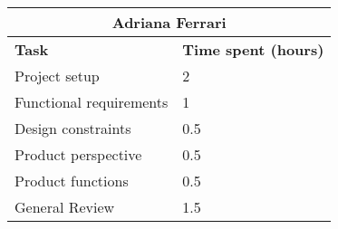 \begin{table}[h]
  \center
  \begin{tabular}{l|l}
    \multicolumn{2}{c}{\textbf{Adriana Ferrari}} \\
    \hline
    \textbf{Task} & \textbf{Time spent (hours)}\\
    \hline
    Project setup & 2 \\
    Functional requirements & 1 \\
    Design constraints & 0.5 \\
    Product perspective & 0.5 \\
    Product functions & 0.5 \\
    General Review & 1.5
  \end{tabular}
\end{table}
